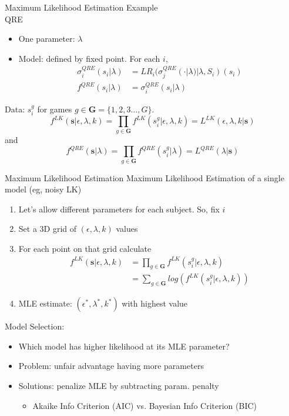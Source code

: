 \begin{frame}{Maximum Likelihood Estimation}
Example\\
QRE
\begin{itemize}
    \item One parameter: $\lambda$
    \item Model: defined by fixed point. For each $i$,
        \begin{align*}
        \sigma_i^{QRE}(s_i|\lambda) &=
        LR_i(\sigma_j^{QRE}(\cdot|\lambda)|\lambda,S_i)(s_i)\\
        f^{QRE}(s_i|\lambda) &= \sigma_i^{QRE}(s_i|\lambda)
        \end{align*}
\end{itemize}

\bigskip
Data: $s_i^g$ for games $g\in \mathbf{G}=\{1,2,3 \dots ,G\}$. 
\begin{equation*}
f^{LK}(\pmb{s}|\epsilon,\lambda,k)=\prod_{g\in \mathbf{G}}f^{LK}(s_i^g|\epsilon,\lambda,k) = L^{LK}(\epsilon,\lambda,k|\pmb {s})
\end{equation*}
and
\begin{equation*}
f^{QRE}(\pmb{s}|\lambda)=\prod_{g\in \mathbf{G}}f^{QRE}(s_i^g|\lambda) =L^{QRE}(\lambda|\pmb {s})
\end{equation*}
\end{frame}




\begin{frame}{Maximum Likelihood Estimation}
Maximum Likelihood Estimation of a single model (eg, noisy LK)
\begin{enumerate}
    \item Let's allow different parameters for each subject. So, fix $i$
    \item Set a 3D grid of $(\epsilon,\lambda,k)$ values
    \item For each point on that grid calculate
    \begin{align*}
        f^{LK}(\mathbf{s}|\epsilon,\lambda,k) &= \prod_{g\in \mathbf{G}}f^{LK}(s_i^g|\epsilon,\lambda,k) \\
        &= \sum_{g\in \mathbf{G}}log(f^{LK}(s_i^g|\epsilon,\lambda,k))
    \end{align*}
    \item MLE estimate: $(\epsilon^*,\lambda^*,k^*)$ with highest value
\end{enumerate}
Model Selection:
\begin{itemize}
    \item Which model has higher likelihood at its MLE parameter?
    \item Problem: unfair advantage having more parameters
    \item Solutions: penalize MLE by subtracting param. penalty
    \begin{itemize}
        \item Akaike Info Criterion (AIC) vs. Bayesian Info Criterion (BIC)
    \end{itemize}
\end{itemize}
\end{frame}



